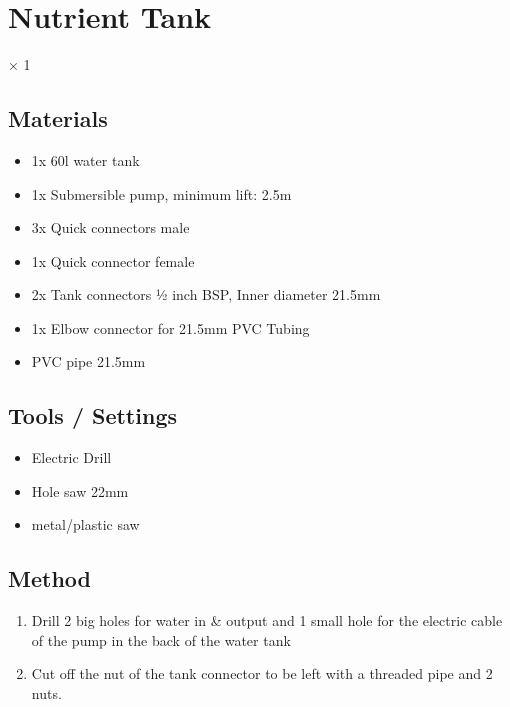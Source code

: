 \documentclass[letterpaper,10pt,english]{sphinxmanual}
\begin{document}
\section{Nutrient Tank}
\label{\detokenize{nutrient_tank:nutrient-tank}}\label{\detokenize{nutrient_tank::doc}}
× 1

\noindent{}


\subsection{Materials}
\label{\detokenize{nutrient_tank:materials}}\begin{itemize}
\item {} 
1x 60l water tank

\item {} 
1x Submersible pump, minimum lift: 2.5m

\item {} 
3x Quick connectors male

\item {} 
1x Quick connector female

\item {} 
2x Tank connectors ½ inch BSP, Inner diameter 21.5mm

\item {} 
1x Elbow connector for 21.5mm PVC Tubing

\item {} 
PVC pipe 21.5mm

\end{itemize}


\subsection{Tools / Settings}
\label{\detokenize{nutrient_tank:tools-settings}}\begin{itemize}
\item {} 
Electric Drill

\item {} 
Hole saw 22mm

\item {} 
metal/plastic saw

\end{itemize}


\subsection{Method}
\label{\detokenize{nutrient_tank:method}}
\noindent{}
\begin{enumerate}
%
\item {} 
Drill 2 big holes for water in \& output and 1 small hole for the electric cable of the pump in the back of the water tank

\item {} 
Cut off the nut of the tank connector to be left with a threaded pipe and 2 nuts.

\end{enumerate}
\end{document}
